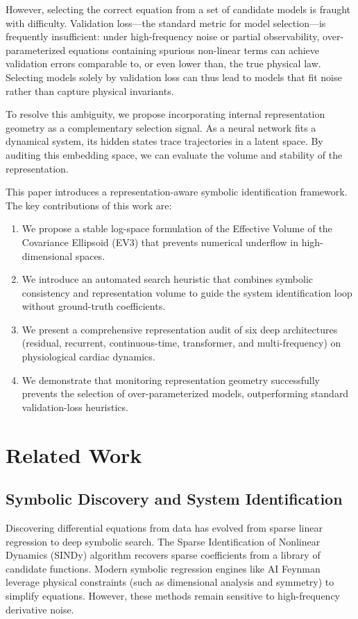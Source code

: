 \documentclass[twocolumn]{article}
\begin{document}
However, selecting the correct equation from a set of candidate models is fraught with difficulty. Validation loss—the standard metric for model selection—is frequently insufficient: under high-frequency noise or partial observability, over-parameterized equations containing spurious non-linear terms can achieve validation errors comparable to, or even lower than, the true physical law. Selecting models solely by validation loss can thus lead to models that fit noise rather than capture physical invariants.

To resolve this ambiguity, we propose incorporating internal representation geometry as a complementary selection signal. As a neural network fits a dynamical system, its hidden states trace trajectories in a latent space. By auditing this embedding space, we can evaluate the volume and stability of the representation. 

This paper introduces a representation-aware symbolic identification framework. The key contributions of this work are:
\begin{enumerate}
    \item We propose a stable log-space formulation of the Effective Volume of the Covariance Ellipsoid (EV3) that prevents numerical underflow in high-dimensional spaces.
    \item We introduce an automated search heuristic that combines symbolic consistency and representation volume to guide the system identification loop without ground-truth coefficients.
    \item We present a comprehensive representation audit of six deep architectures (residual, recurrent, continuous-time, transformer, and multi-frequency) on physiological cardiac dynamics.
    \item We demonstrate that monitoring representation geometry successfully prevents the selection of over-parameterized models, outperforming standard validation-loss heuristics.
\end{enumerate}

\section{Related Work}
\label{sec:related}

\subsection{Symbolic Discovery and System Identification}
Discovering differential equations from data has evolved from sparse linear regression to deep symbolic search. The Sparse Identification of Nonlinear Dynamics (SINDy) algorithm \citep{brunton2016discovering} recovers sparse coefficients from a library of candidate functions. Modern symbolic regression engines like AI Feynman \citep{udrescu2020ai} leverage physical constraints (such as dimensional analysis and symmetry) to simplify equations. However, these methods remain sensitive to high-frequency derivative noise.
\end{document}
